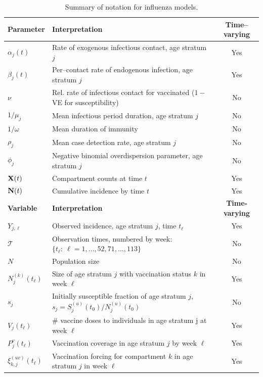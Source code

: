 \begin{table}[htbp]
	\caption{Summary of notation for influenza models.}
	\label{tab:flu_notation}
	\footnotesize
	\centering
	\begin{tabular}{llc}
		\hline
		\textbf{Parameter} & \textbf{Interpretation} & \textbf{Time--varying}\\
		\hline
		$\alpha_j(t)$ & Rate of exogenous infectious contact, age stratum $ j $ & Yes \\
		$ \beta_j(t) $ & Per--contact rate of endogenous infection, age stratum $ j $ & Yes \\
		$ \nu $ & Rel. rate of infectious contact for vaccinated ($ 1- $VE for susceptibility) & No \\
		$1/\mu_j$ & Mean infectious period duration, age stratum $ j $ & No\\
		$ 1/\omega $ & Mean duration of immunity & No \\
		$ \rho_j $ & Mean case detection rate, age stratum $ j $ & No\\
		$ \phi_j $ & Negative binomial overdispersion parameter, age stratum $ j $ & No \\
		$ \mathbf{X}(t) $ & Compartment counts at time $ t $ & Yes\\
		$ \mathbf{N}(t) $ & Cumulative incidence by time $ t $ & Yes \\
		\hline \hline
		\textbf{Variable} & \textbf{Interpretation} & \textbf{Time-varying}\\
		\hline		
		$ Y_{j,\ell} $ & Observed incidence, age stratum $ j $, time $ t_\ell $ & Yes \\
		$ \mathcal{T} $ & Observation times, numbered by week:  $ \lbrace t_\ell:\ \ell=1,\dots,52,71,\dots,113\rbrace $& No \\
		$ N$ & Population size & No\\
		$ N_{j}^{(k)}(t_\ell) $ & Size of age stratum $ j $ with vaccination status $ k $ in week $ \ell $ & Yes \\
		$ s_{j} $ & Initially susceptible fraction of age stratum $ j $, $ s_j = S_j^{(u)}(t_0) / N_{j}^{(u)}(t_0) $ & No\\ 
		$ V_{j}(t_\ell) $ & \# vaccine doses to individuals in age stratum j at week $ \ell $ & Yes\\	
		$ P^v_{j}(t_\ell) $ & Vaccination coverage in age stratum $ j $ by week $ \ell $ & Yes \\
		$ \xi_{k,j}^{(uv)}(t_\ell) $ & Vaccination forcing for compartment $ k $ in age stratum $ j $ in week $ \ell $ & Yes\\

\end{tabular}
\end{table}
